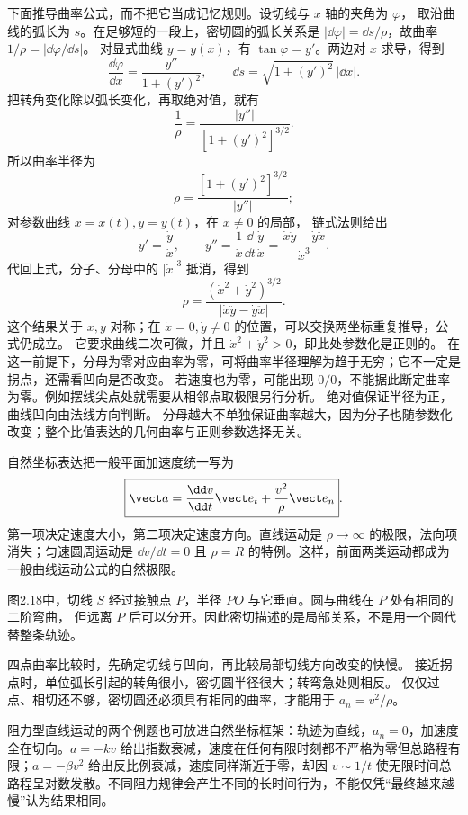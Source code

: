 下面推导曲率公式，而不把它当成记忆规则。设切线与 $x$ 轴的夹角为 $\varphi$，
取沿曲线的弧长为 $s$。在足够短的一段上，密切圆的弧长关系是
$|\dd\varphi|=\dd s/\rho$，故曲率 $1/\rho=|\dd\varphi/\dd s|$。
对显式曲线 $y=y(x)$，有 $\tan\varphi=y'$。两边对 $x$ 求导，得到
\[
 \frac{\dd\varphi}{\dd x}=\frac{y''}{1+(y')^2},
 \qquad \dd s=\sqrt{1+(y')^2}\,|\dd x|.
\]
把转角变化除以弧长变化，再取绝对值，就有
\[
 \frac1\rho=\frac{|y''|}{[1+(y')^2]^{3/2}}.
\]
所以曲率半径为
\begin{equation}
 \rho=\frac{[1+(y')^2]^{3/2}}{|y''|};
\end{equation}
对参数曲线 $x=x(t),y=y(t)$，在 $\dot x\ne0$ 的局部，
链式法则给出
\[
 y'=\frac{\dot y}{\dot x},\qquad
 y''=\frac1{\dot x}\frac{\dd}{\dd t}\frac{\dot y}{\dot x}
 =\frac{\dot x\ddot y-\dot y\ddot x}{\dot x^3}.
\]
代回上式，分子、分母中的 $|\dot x|^3$ 抵消，得到
\begin{equation}
 \rho=\frac{(\dot x^2+\dot y^2)^{3/2}}
 {|\dot x\ddot y-\dot y\ddot x|}.
\end{equation}
这个结果关于 $x,y$ 对称；在 $\dot x=0,\dot y\ne0$ 的位置，可以交换两坐标重复推导，公式仍成立。
它要求曲线二次可微，并且 $\dot x^2+\dot y^2>0$，即此处参数化是正则的。
在这一前提下，分母为零对应曲率为零，可将曲率半径理解为趋于无穷；它不一定是拐点，还需看凹向是否改变。
若速度也为零，可能出现 $0/0$，不能据此断定曲率为零。例如摆线尖点处就需要从相邻点取极限另行分析。
绝对值保证半径为正，曲线凹向由法线方向判断。
分母越大不单独保证曲率越大，因为分子也随参数化改变；整个比值表达的几何曲率与正则参数选择无关。

自然坐标表达把一般平面加速度统一写为
\begin{equation}
 \boxed{\vect a=\frac{\dd v}{\dd t}\vect e_t+\frac{v^2}{\rho}\vect e_n}.
\end{equation}
第一项决定速度大小，第二项决定速度方向。直线运动是 $\rho\to\infty$ 的极限，法向项消失；匀速圆周运动是 $\dd v/\dd t=0$ 且 $\rho=R$ 的特例。这样，前面两类运动都成为一般曲线运动公式的自然极限。

图2.18中，切线 $S$ 经过接触点 $P$，半径 $PO$ 与它垂直。圆与曲线在 $P$ 处有相同的二阶弯曲，
但远离 $P$ 后可以分开。因此密切描述的是局部关系，不是用一个圆代替整条轨迹。

四点曲率比较时，先确定切线与凹向，再比较局部切线方向改变的快慢。
接近拐点时，单位弧长引起的转角很小，密切圆半径很大；转弯急处则相反。
仅仅过点、相切还不够，密切圆还必须具有相同的曲率，才能用于 $a_n=v^2/\rho$。

阻力型直线运动的两个例题也可放进自然坐标框架：轨迹为直线，$a_n=0$，加速度全在切向。$a=-kv$ 给出指数衰减，速度在任何有限时刻都不严格为零但总路程有限；$a=-\beta v^2$ 给出反比例衰减，速度同样渐近于零，却因 $v\sim1/t$ 使无限时间总路程呈对数发散。不同阻力规律会产生不同的长时间行为，不能仅凭“最终越来越慢”认为结果相同。

